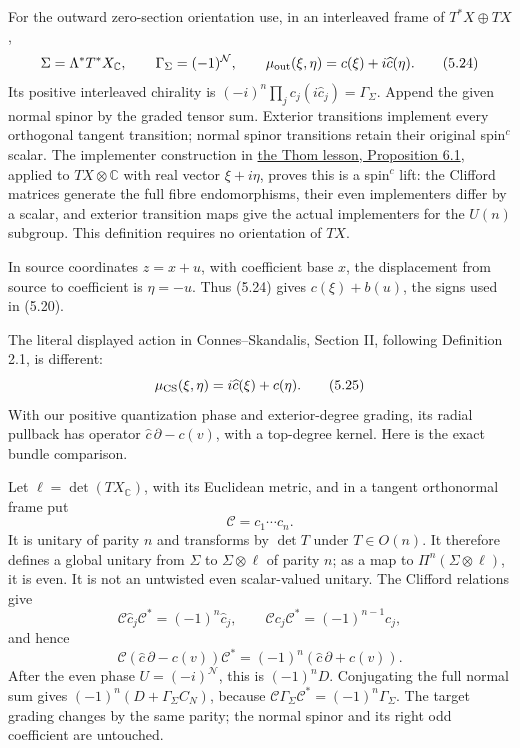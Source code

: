 \documentclass[
  11pt,
]{article}
\begin{document}
For the outward zero-section orientation use, in an interleaved frame of
\(T^*X\oplus TX\), \[
\Sigma=\Lambda^*T^*X_{\mathbb C},\qquad
\Gamma_\Sigma=(-1)^{\mathcal N},\qquad
\mu_{\rm out}(\xi,\eta)=c(\xi)+i\widehat c(\eta).
\tag{5.24}
\] Its positive interleaved chirality is
\((-i)^n\prod_j c_j(i\widehat c_j)=\Gamma_\Sigma\). Append the given
normal spinor by the graded tensor sum. Exterior transitions implement
every orthogonal tangent transition; normal spinor transitions retain
their original spin\(^{c}\) scalar. The implementer construction in
\href{KT-KK-13.html\#6-complex-bundles-and-relative-symbols}{the Thom
lesson, Proposition 6.1}, applied to \(TX\otimes\mathbb C\) with real
vector \(\xi+i\eta\), proves this is a spin\(^{c}\) lift: the Clifford
matrices generate the full fibre endomorphisms, their even implementers
differ by a scalar, and exterior transition maps give the actual
implementers for the \(U(n)\) subgroup. This definition requires no
orientation of \(TX\).

In source coordinates \(z=x+u\), with coefficient base \(x\), the
displacement from source to coefficient is \(\eta=-u\). Thus (5.24)
gives \(c(\xi)+b(u)\), the signs used in (5.20).

The literal displayed action in Connes--Skandalis, Section II, following
Definition 2.1, is different: \[
\mu_{\rm CS}(\xi,\eta)=i\widehat c(\xi)+c(\eta).
\tag{5.25}
\] With our positive quantization phase and exterior-degree grading, its
radial pullback has operator \(\widehat c\,\partial-c(v)\), with a
top-degree kernel. Here is the exact bundle comparison.

Let \(\ell=\det(TX_{\mathbb C})\), with its Euclidean metric, and in a
tangent orthonormal frame put \[
\mathcal C=c_1\cdots c_n.
\tag{5.26}
\] It is unitary of parity \(n\) and transforms by \(\det T\) under
\(T\in O(n)\). It therefore defines a global unitary from \(\Sigma\) to
\(\Sigma\otimes\ell\) of parity \(n\); as a map to
\(\Pi^n(\Sigma\otimes\ell)\), it is even. It is not an untwisted even
scalar-valued unitary. The Clifford relations give \[
\mathcal C\widehat c_j\mathcal C^*=(-1)^n\widehat c_j,\qquad
\mathcal Cc_j\mathcal C^*=(-1)^{n-1}c_j,
\tag{5.27}
\] and hence \[
\mathcal C(\widehat c\,\partial-c(v))\mathcal C^*
=(-1)^n(\widehat c\,\partial+c(v)).
\tag{5.28}
\] After the even phase \(U=(-i)^{\mathcal N}\), this is \((-1)^nD\).
Conjugating the full normal sum gives \((-1)^n(D+\Gamma_\Sigma C_N)\),
because \(\mathcal C\Gamma_\Sigma\mathcal C^*=(-1)^n\Gamma_\Sigma\). The
target grading changes by the same parity; the normal spinor and its
right odd coefficient are untouched.
\end{document}
